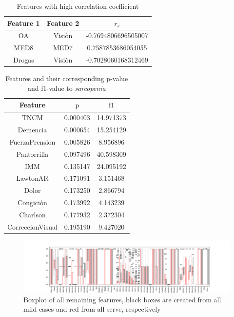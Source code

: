 \documentclass[11pt]{article}
\begin{document}
\begin{table}[t]
\centering
\begin{tabular}{|c c|S|}
\hline
Feature 1 & Feature 2 & $r_s$ \\ \hline
OA&Visiòn&-0.7694806696505007\\
MED8&MED7& 0.7587853686054055\\
Drogas&Visiòn&-0.7028060168312469\\ \hline
\end{tabular}
\caption{Features with high correlation coefficient}
\label{table:corr}
\end{table}

\begin{table}[t]
\centering
\begin{tabular}{|c|S S|}
\hline
Feature & $\text{p}$		& $\text{f1}$ \\ \hline
TNCM	& 0.000403	& 14.971373\\
Demencia& 0.000654 	& 15.254129\\
FuerzaPrension &  0.005826    &   8.956896\\
Pantorrilla &   0.097496       &  40.598309\\
IMM & 0.135147   &  24.095192\\
LawtonAR &    0.171091   &   3.151468\\
Dolor &     0.173250  &   2.866794\\
Congiciòn &     0.173992    &   4.143239\\
Charlson &    0.177932  &   2.372304\\
CorreccionVisual &  0.195190  &   9.427020\\
\hline
\end{tabular}
\caption{Features and their corresponding p-value and f1-value to \emph{sarcopenia} }
\label{table:chi2_anova}
\end{table}

\begin{figure}[t]
\includegraphics[width=\linewidth]{boxplot_serve_mild.png}
\caption{Boxplot of all remaining features, black boxes are created from all mild cases and red from all serve, respectively}
\label{fig:boxplots}
\end{figure}
\end{document}

